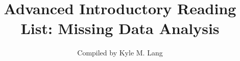 \documentclass[12pt]{article}
\title{Advanced Introductory Reading List: Missing Data Analysis}
\author{Compiled by Kyle M. Lang}
\begin{document}
\maketitle

\nocite{*}



\end{document}
